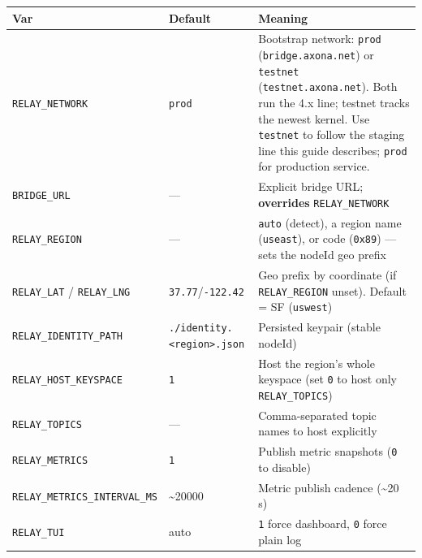 \documentclass[
  nobib]{tufte-handout}
\newcounter{none} %
\begin{document}
{\def\LTcaptype{none} %
\begin{longtable}[]{@{}
  >{\raggedright\arraybackslash}p{}
  >{\raggedright\arraybackslash}p{}
  >{\raggedright\arraybackslash}p{}@{}}
\toprule\noalign{}
\begin{minipage}[b]{\linewidth}\raggedright
Var
\end{minipage} & \begin{minipage}[b]{\linewidth}\raggedright
Default
\end{minipage} & \begin{minipage}[b]{\linewidth}\raggedright
Meaning
\end{minipage} \\
\midrule\noalign{}
\endhead
\bottomrule\noalign{}
\endlastfoot
\texttt{RELAY\_NETWORK} & \texttt{prod} & Bootstrap network:
\texttt{prod} (\texttt{bridge.axona.net}) or \texttt{testnet}
(\texttt{testnet.axona.net}). Both run the 4.x line; testnet tracks the
newest kernel. Use \texttt{testnet} to follow the staging line this
guide describes; \texttt{prod} for production service. \\
\texttt{BRIDGE\_URL} & --- & Explicit bridge URL; \textbf{overrides}
\texttt{RELAY\_NETWORK} \\
\texttt{RELAY\_REGION} & --- & \texttt{auto} (detect), a region name
(\texttt{useast}), or code (\texttt{0x89}) --- sets the nodeId geo
prefix \\
\texttt{RELAY\_LAT} / \texttt{RELAY\_LNG} &
\texttt{37.77}/\texttt{-122.42} & Geo prefix by coordinate (if
\texttt{RELAY\_REGION} unset). Default = SF (\texttt{uswest}) \\
\texttt{RELAY\_IDENTITY\_PATH} &
\texttt{./identity.\textless{}region\textgreater{}.json} & Persisted
keypair (stable nodeId) \\
\texttt{RELAY\_HOST\_KEYSPACE} & \texttt{1} & Host the region's whole
keyspace (set \texttt{0} to host only \texttt{RELAY\_TOPICS}) \\
\texttt{RELAY\_TOPICS} & --- & Comma-separated topic names to host
explicitly \\
\texttt{RELAY\_METRICS} & \texttt{1} & Publish metric snapshots
(\texttt{0} to disable) \\
\texttt{RELAY\_METRICS\_INTERVAL\_MS} & \textasciitilde20000 & Metric
publish cadence (\textasciitilde20 s) \\
\texttt{RELAY\_TUI} & auto & \texttt{1} force dashboard, \texttt{0}
force plain log \\
\end{longtable}
}
\end{document}
